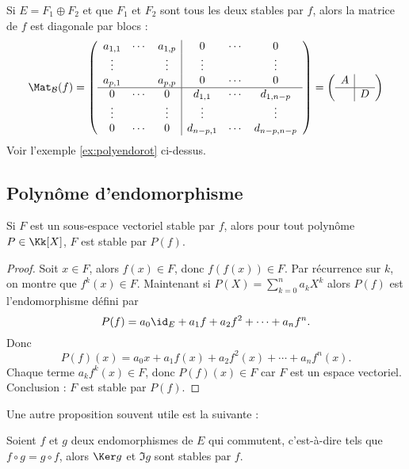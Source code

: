 \documentclass[12pt, class=report,crop=false]{standalone}
\begin{document}
\begin{remarque*}
Si $E = F_1 \oplus F_2$ et que $F_1$ et $F_2$ sont tous les deux stables par $f$,
alors la matrice de $f$ est diagonale par blocs :
\[\Mat_{\mathcal{B}}(f) = 
\left(\begin{array}{ccc|ccc}
a_{1,1}&\cdots&a_{1,p}&0&\cdots&0\\
\vdots&&\vdots&\vdots&&\vdots\\
a_{p,1}&&a_{p,p}&0&\cdots&0\\ \hline
0&\cdots&0&d_{1,1}&\cdots&d_{1,n-p}\\
\vdots&&\vdots&\vdots&&\vdots\\
0&\cdots&0&d_{n-p,1}&\cdots&d_{n-p,n-p}
\end{array}\right)
=
\left(\begin{array}{c|c}
A & \\ \hline
  & D\\
\end{array}\right)
\]
Voir l'exemple \ref{ex:polyendorot} ci-dessus.
\end{remarque*}



\subsection{Polynôme d'endomorphisme}


\begin{lemme}
Si $F$ est un sous-espace vectoriel stable par $f$, alors pour tout polynôme $P \in \Kk[X]$, $F$ est stable par $P(f)$.
\end{lemme} 

\begin{proof}
Soit $x \in F$, alors $f(x) \in F$, donc $f(f(x)) \in F$. 
Par récurrence sur $k$, on montre que $f^{k}(x)\in F$.
Maintenant si $P(X)=\sum_{k=0}^n a_k X^k$ alors
$P(f)$ est l'endomorphisme défini par
$$P(f)=a_0 \id_E+a_1 f+a_2 f^2+\cdots+a_n f^n.$$
Donc 
$$P(f)(x)=a_0 x+a_1 f(x)+a_2 f^2(x)+\cdots+a_n f^n(x).$$
Chaque terme $a_k f^k(x) \in F$, donc $P(f)(x) \in F$ car $F$ est un espace vectoriel.
Conclusion : $F$ est stable par $P(f)$.
\end{proof}

\bigskip


Une autre proposition souvent utile est la suivante :

\begin{proposition}
Soient $f$ et $g$ deux endomorphismes de $E$ qui commutent, c'est-à-dire tels que $f \circ g=g \circ f$, 
alors $\Ker g$ et $\Im g$ sont stables par $f$.
\end{proposition} 
\end{document}
